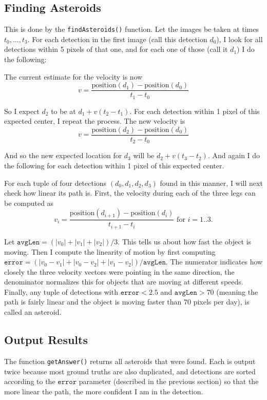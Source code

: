 \documentclass[letterpaper,options]{article}
\begin{document}
\subsection{Finding Asteroids}
This is done by the \texttt{findAsteroids()} function. 	Let the images be taken at times $t_0,\ldots,t_3$. For each detection in the first image (call this detection $d_0$), I look for all detections within  5 pixels of that one, and for each one of those (call it $d_1$) I do the following:

The current estimate for the velocity is now 
$$v=\frac{\text{position}(d_1 )-\text{position}(d_0)}{t_1-t_0}$$

So I expect $d_2$ to be at $d_1+v(t_2-t_1)$. For each detection within 1 pixel of this expected center, I repeat the process. The new velocity is  
$$v=\frac{\text{position}(d_2 )-\text{position}(d_0 )}{t_2-t_0}$$

And so the new expected location for $d_3$ will be $d_2+v(t_3-t_2)$. And again I do the following for each detection within 1 pixel of this expected center.

For each tuple of four detections $(d_0,d_1,d_2,d_3)$ found in this manner, I will next check how linear its path is. First, the velocity during each of the three legs can be computed as $$\text{$v_i=\frac{\text{position}(d_{i+1} )-\text{position}(d_i)}{t_{i+1}-t_i}$ for $i=1..3.$}$$

Let $\texttt{avgLen}=(|v_0 |+|v_1 |+|v_2 |)/3$. This tells us about how fast the object is moving. Then I compute the linearity of motion by first computing $\texttt{error}=(|v_0-v_1 |+|v_0-v_2 |+|v_1-v_2 |)/\texttt{avgLen}$. The numerator indicates how closely the three velocity vectors were pointing in the same direction, the denominator normalizes this for objects that are moving at different speeds. Finally, any tuple of detections with $\texttt{error}<2.5$ and $\texttt{avgLen}>70$ (meaning the path is fairly linear and the object is moving faster than 70 pixels per day), is called an asteroid.

\subsection{Output Results}
The function \texttt{getAnswer()} returns all asteroids that were found. Each is output twice because most ground truths are also duplicated, and detections are sorted according to the $\texttt{error}$ parameter (described in the previous section) so that the more linear the path, the more confident I am in the detection.
\end{document}
